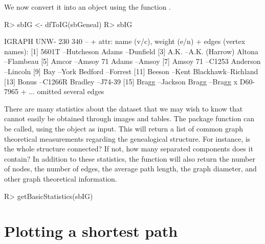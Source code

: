 \documentclass[article,shortnames]{jss}
\begin{document}
We now convert it into an  object  using the function
.
\begin{CodeChunk}
\begin{CodeInput}
R> sbIG <- dfToIG(sbGeneal)
R> sbIG
\end{CodeInput}
\begin{CodeOutput}
IGRAPH UNW- 230 340 --
+ attr: name (v/c), weight (e/n)
+ edges (vertex names):
 [1] 5601T    --Hutcheson        Adams    --Dunfield
 [3] A.K.     --A.K. (Harrow)    Altona   --Flambeau
 [5] Amcor    --Amsoy 71         Adams    --Amsoy
 [7] Amsoy 71 --C1253            Anderson --Lincoln
 [9] Bay      --York             Bedford  --Forrest
[11] Beeson   --Kent             Blackhawk--Richland
[13] Bonus    --C1266R           Bradley  --J74-39
[15] Bragg    --Jackson          Bragg    --Bragg x D60-7965
+ ... omitted several edges
\end{CodeOutput}
\end{CodeChunk}

There are many statistics about the  dataset that we may wish to know that cannot easily be obtained through images and tables. The package function  can be called, using the  object as input. This will return a list of common graph theoretical measurements regarding the genealogical structure. For instance, is the whole structure connected? If not, how many separated components does it contain? In addition to these statistics, the  function will also return the number of nodes, the number of edges, the average path length, the graph diameter, and other graph theoretical information.

\begin{CodeChunk}
\begin{CodeInput}
R> getBasicStatistics(sbIG)
\end{CodeInput}
\end{CodeChunk}

\section{Plotting a shortest path}
\label{psp}
\end{document}

